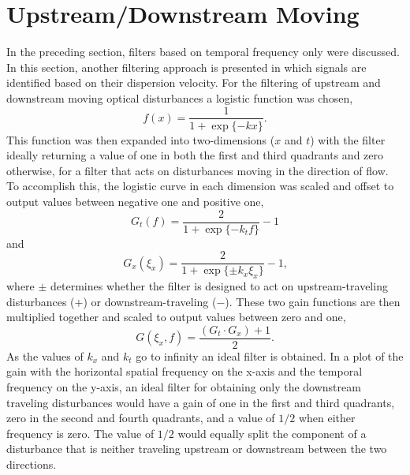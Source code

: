 \section{Upstream/Downstream Moving}
\label{chap:06_up_down_filter}
In the preceding section, filters based on temporal frequency only were discussed. In this section, another filtering approach is presented in which signals are identified based on their dispersion velocity.
For the filtering of upstream and downstream moving optical disturbances a logistic function was chosen,
\begin{equation}
 f(x) = \frac{1}{1+\exp\{-kx\}} \textrm{.}
 \label{eqn:06_logistic}
\end{equation}
This function was then expanded into two-dimensions ($x$ and $t$) with the filter ideally returning a value of one in both the first and third quadrants and zero otherwise, for a filter that acts on disturbances moving in the direction of flow.
To accomplish this, the logistic curve in each dimension was scaled and offset to output values between negative one and positive one,
\begin{equation}
 G_t(f) = \frac{2}{1+\exp\{-k_tf\}}-1
 \label{eqn:06_logistic_time}
\end{equation}
and
\begin{equation}
 G_x(\xi_x) = \frac{2}{1+\exp\{\pm k_x\xi_x\}}-1 \textrm{,}
 \label{eqn:06_logistic_space}
\end{equation}
where $\pm$ determines whether the filter is designed to act on upstream-traveling disturbances ($+$) or downstream-traveling ($-$).
These two gain functions are then multiplied together and scaled to output values between zero and one,
\begin{equation}
 G(\xi_x,f) = \frac{(G_t\cdot G_x)+1}{2} \textrm{.}
 \label{eqn:06_up_down_filter}
\end{equation}
As the values of $k_x$ and $k_t$ go to infinity an ideal filter is obtained.
In a plot of the gain with the horizontal spatial frequency on the x-axis and the temporal frequency on the y-axis, an ideal filter for obtaining only the downstream traveling disturbances would have a gain of one in the first and third quadrants, zero in the second and fourth quadrants, and a value of $1/2$ when either frequency is zero.
The value of $1/2$ would equally split the component of a disturbance that is neither traveling upstream or downstream between the two directions.

